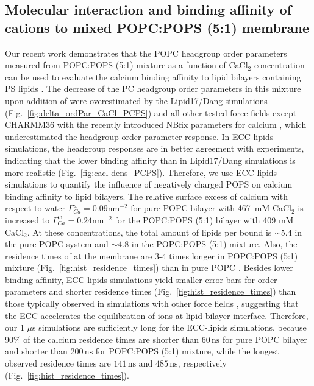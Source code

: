 \documentclass[journal=jctcce,manuscript=article]{achemso}
\begin{document}
\subsection{Molecular interaction and binding affinity of  cations to mixed POPC:POPS (5:1) membrane} 
\label{section:lip-ion_ca}
Our recent work demonstrates that the POPC headgroup order parameters measured
from POPC:POPS (5:1) mixture as a function of CaCl$_2$ concentration 
can be used to evaluate the calcium binding affinity to lipid bilayers containing PS lipids \cite{roux90,NMRlipidsIV}.
The decrease of the PC headgroup order parameters in this mixture upon addition of  
were overestimated by the Lipid17/Dang simulations (Fig.~\ref{fig:delta_ordPar_CaCl_PCPS})
and all other tested force fields except CHARMM36 with the recently introduced NBfix parameters for calcium \cite{kim16,han2018graph},
which underestimated the headgroup order parameter response.
In ECC-lipids simulations, the headgroup responses are in better agreement with experiments,
indicating that the lower binding affinity than in Lipid17/Dang simulations is more realistic (Fig.~\ref{fig:cacl-dens_PCPS}).
Therefore, we use ECC-lipids simulations to quantify the influence of negatively charged POPS on
calcium binding affinity to lipid bilayers.
The relative surface excess of calcium with respect to water 
$\Gamma^{w}_{Ca} = 0.09\mathrm{nm^{-2}}$
for pure POPC bilayer with 467~mM CaCl$_2$ \cite{ECC-POPC_nacl_cacl2_files}
is increased to
$\Gamma^{w}_{Ca} = 0.24\mathrm{nm^{-2}}$
for the POPC:POPS (5:1) bilayer with 409 mM CaCl$_2$.
At these concentrations, the total amount of lipids per bound  is
$\sim 5.4$ in the pure POPC system and $\sim 4.8$ in the POPC:POPS (5:1) mixture.
Also, the residence times of  at the membrane 
are 3-4 times longer in POPC:POPS (5:1) mixture (Fig.~\ref{fig:hist_residence_times}) than in pure POPC \cite{melcr18}.
Besides lower binding affinity, ECC-lipids simulations yield smaller error bars for order parameters and shorter residence times (Fig.~\ref{fig:hist_residence_times}) 
than those typically observed in simulations with other force fields \cite{javanainen17,melcr18,NMRlipidsIV},
suggesting that the ECC accelerates the equilibration of ions at lipid bilayer interface.
Therefore, our 1 $\mu$s simulations are sufficiently long for the ECC-lipids simulations, because
90\% of the calcium residence times are shorter than $60\,\mathrm{ns}$ for pure POPC bilayer
and shorter than $200\,\mathrm{ns}$ for POPC:POPS (5:1) mixture, while the
longest observed residence times are $141\,\mathrm{ns}$ and $485\,\mathrm{ns}$, respectively (Fig.~\ref{fig:hist_residence_times}).
\end{document}

